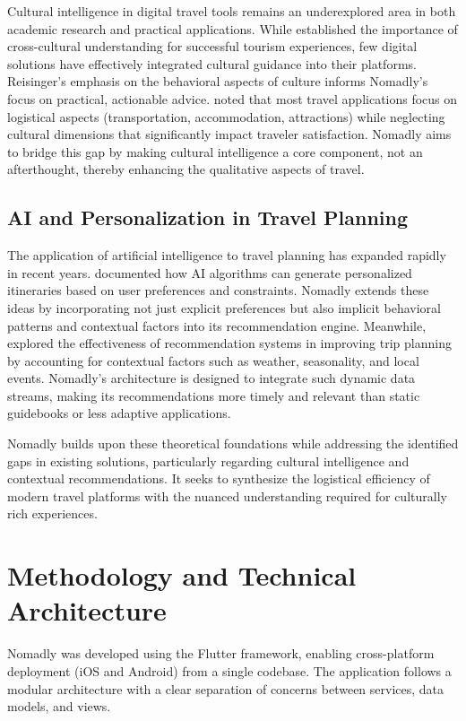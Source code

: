 \documentclass[11pt, a4paper]{article}
\begin{document}
Cultural intelligence in digital travel tools remains an underexplored area in both academic research and practical applications. While \cite{reisinger2009} established the importance of cross-cultural understanding for successful tourism experiences, few digital solutions have effectively integrated cultural guidance into their platforms. Reisinger's emphasis on the behavioral aspects of culture informs Nomadly's focus on practical, actionable advice. \cite{sharma2019} noted that most travel applications focus on logistical aspects (transportation, accommodation, attractions) while neglecting cultural dimensions that significantly impact traveler satisfaction. Nomadly aims to bridge this gap by making cultural intelligence a core component, not an afterthought, thereby enhancing the qualitative aspects of travel.

\subsection{AI and Personalization in Travel Planning}

The application of artificial intelligence to travel planning has expanded rapidly in recent years. \cite{liu2021} documented how AI algorithms can generate personalized itineraries based on user preferences and constraints. Nomadly extends these ideas by incorporating not just explicit preferences but also implicit behavioral patterns and contextual factors into its recommendation engine. Meanwhile, \cite{borras2022} explored the effectiveness of recommendation systems in improving trip planning by accounting for contextual factors such as weather, seasonality, and local events. Nomadly's architecture is designed to integrate such dynamic data streams, making its recommendations more timely and relevant than static guidebooks or less adaptive applications.

Nomadly builds upon these theoretical foundations while addressing the identified gaps in existing solutions, particularly regarding cultural intelligence and contextual recommendations. It seeks to synthesize the logistical efficiency of modern travel platforms with the nuanced understanding required for culturally rich experiences.

\section{Methodology and Technical Architecture}

Nomadly was developed using the Flutter framework, enabling cross-platform deployment (iOS and Android) from a single codebase. The application follows a modular architecture with a clear separation of concerns between services, data models, and views.
\end{document}
